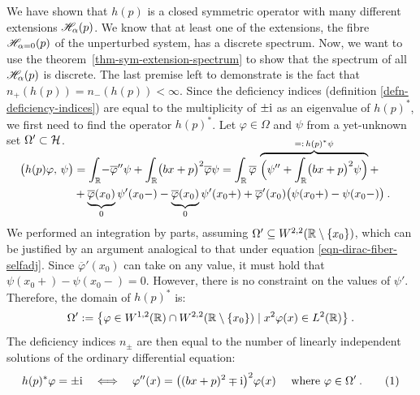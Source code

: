 We have shown that $h(p)$ is a closed symmetric operator with many different extensions $\mathscr{H}_\alpha(p)$. We know that at least one of the extensions, the fibre $\mathscr{H}_{\alpha = 0}(p)$ of the unperturbed system, has a discrete spectrum. Now, we want to use the theorem~\ref{thm-sym-extension-spectrum} to show that the spectrum of all $\mathscr{H}_\alpha(p)$ is discrete. The last premise left to demonstrate is the fact that $n_+(h(p)) = n_-(h(p)) < \infty$. Since the deficiency indices (definition \ref{defn-deficiency-indices}) are equal to the multiplicity of $\pm\mathrm{i}$ as an eigenvalue of $h(p)^*$, we first need to find the operator $h(p)^*$. Let $\varphi \in \Omega$ and $\psi$ from a yet-unknown set $\Omega'\subset\mathcal{H}$.
\begin{align*}
    \\[-2\baselineskip]
    \big( h(p) \varphi, \, \psi \big)
    &= \int_\R\! -\overline\varphi'' \psi
    + \int_\R\! \big( bx + p \big)^2 \overline\varphi\psi
    = \int_\R \overline\varphi \, \overbrace{\Big(
        \psi'' + \int_\R\! \big(bx + p\big)^2 \psi
    \Big)}^{=: \, h(p)^* \psi} + \ph{x}\\
    &+ \underbrace{\vph{\big|} \overline\varphi(x_0)}_0 \psi'(x_0-)
    - \underbrace{\vph{\big|} \overline\varphi(x_0)}_0 \psi'(x_0+)
    + \overline\varphi'(x_0) \big( \psi(x_0+) - \psi(x_0-) \big)
    \: .
\end{align*}
We performed an integration by parts, assuming $\Omega' \subseteq W^{2,2}(\mathbb{R} \setminus \{x_0\})$, which can be justified by an argument analogical to that under equation \eqref{eqn-dirac-fiber-selfadj}. Since $\overline\varphi'(x_0)$ can take on any value, it must hold that $\psi(x_0+) - \psi(x_0-) = 0$. However, there is no constraint on the values of $\psi'$. Therefore, the domain of $h(p)^*$ is:
\begin{equation*}
    \Omega' := \big\{
        \varphi \in W^{1,2}(\mathbb{R}) \cap W^{2,2}(\mathbb{R} \setminus \{x_0\})
        \; | \;
        x^2 \varphi(x) \in L^2(\mathbb{R})
    \big\}
    \: .
\end{equation*}
The deficiency indices $n_\pm$ are then equal to the number of linearly independent solutions of the ordinary differential equation:
\begin{equation*}
    h(p)^* \varphi = \pm \i
    \quad \Longleftrightarrow \quad
    \varphi''(x) = \big( (bx + p)^2 \mp \i \big)^2 \varphi(x)
    \quad \text{ where } \varphi \in \Omega'
    \: .
    \numberthis\label{eqn-dirac-deficiency-indices-ode}
\end{equation*}

